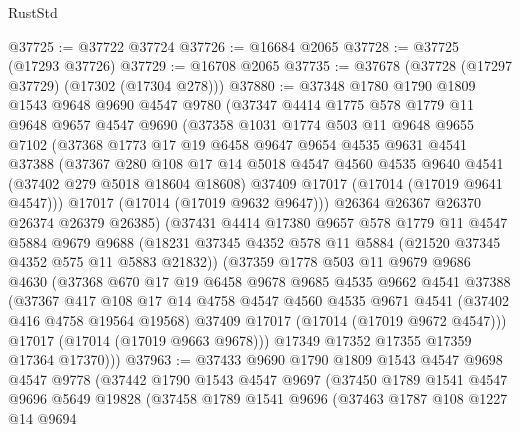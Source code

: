 \begin{lexlean}{RustStd}
\begin{coremodule}
{\begin{coremodule}
{{{{{{{{{{{{{{{{{{{{{{{{{{{{{{{{{{{{{{{{{{{{{{{{{{{{{{{@37725 := @37722 @37724
@37726 := @16684 @2065
@37728 := @37725 (@17293 @37726)
@37729 := @16708 @2065
@37735 := @37678 (@37728 (@17297 @37729) (@17302 (@17304 @278)))
@37880 := @37348
    @1780
    @1790
    @1809
    @1543
    @9648
    @9690
    @4547
    @9780
    (@37347
      @4414
      @1775
      @578
      @1779
      @11
      @9648
      @9657
      @4547
      @9690
      (@37358
        @1031
        @1774
        @503
        @11
        @9648
        @9655
        @7102
        (@37368
          @1773
          @17
          @19
          @6458
          @9647
          @9654
          @4535
          @9631
          @4541
          @37388
          (@37367
            @280
            @108
            @17
            @14
            @5018
            @4547
            @4560
            @4535
            @9640
            @4541
            (@37402 @279 @5018 @18604 @18608)
            @37409
            @17017
            (@17014 (@17019 @9641 @4547)))
          @17017
          (@17014 (@17019 @9632 @9647)))
        @26364
        @26367
        @26370
        @26374
        @26379
        @26385)
      (@37431
        @4414
        @17380
        @9657
        @578
        @1779
        @11
        @4547
        @5884
        @9679
        @9688
        (@18231 @37345 @4352 @578 @11 @5884 (@21520 @37345 @4352 @575 @11 @5883 @21832))
        (@37359
          @1778
          @503
          @11
          @9679
          @9686
          @4630
          (@37368
            @670
            @17
            @19
            @6458
            @9678
            @9685
            @4535
            @9662
            @4541
            @37388
            (@37367
              @417
              @108
              @17
              @14
              @4758
              @4547
              @4560
              @4535
              @9671
              @4541
              (@37402 @416 @4758 @19564 @19568)
              @37409
              @17017
              (@17014 (@17019 @9672 @4547)))
            @17017
            (@17014 (@17019 @9663 @9678)))
          @17349
          @17352
          @17355
          @17359
          @17364
          @17370)))
@37963 := @37433
    @9690
    @1790
    @1809
    @1543
    @4547
    @9698
    @4547
    @9778
    (@37442
      @1790
      @1543
      @4547
      @9697
      (@37450
        @1789
        @1541
        @4547
        @9696
        @5649
        @19828
        (@37458
          @1789
          @1541
          @9696
          (@37463
            @1787
            @108
            @1227
            @14
            @9694
}}}}}}}}}}}}}}}}}}}}}}}}}}}}}}}}}}}}}}}}}}}}}}}}}}}}}}}
\end{coremodule}}
\end{coremodule}
\end{lexlean}
